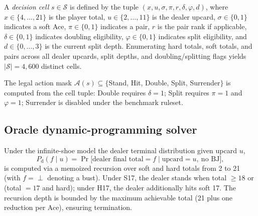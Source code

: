 \documentclass[12pt]{article}
\begin{document}
A \emph{decision cell} $s \in \mathcal{S}$ is defined by the tuple
$(x, u, \sigma, \pi, r, \delta, \varphi, d)$, where $x \in \{4,\ldots,21\}$ is the
player total, $u \in \{2,\ldots,11\}$ is the dealer upcard, $\sigma \in \{0,1\}$
indicates a soft Ace, $\pi \in \{0,1\}$ indicates a pair, $r$ is the pair rank if
applicable, $\delta \in \{0,1\}$ indicates doubling eligibility, $\varphi \in \{0,1\}$
indicates split eligibility, and $d \in \{0,\ldots,3\}$ is the current split depth.
Enumerating hard totals, soft totals, and pairs across all dealer upcards, split depths,
and doubling/splitting flags yields $|\mathcal{S}| = 4{,}600$ distinct cells.

The legal action mask $\mathcal{A}(s) \subseteq \{$Stand, Hit, Double, Split, Surrender$\}$
is computed from the cell tuple: Double requires $\delta=1$; Split requires $\pi=1$
and $\varphi=1$; Surrender is disabled under the benchmark ruleset.

\subsection{Oracle dynamic-programming solver}

Under the infinite-shoe model the dealer terminal distribution given upcard $u$,
\begin{equation}
  P_\mathrm{d}(f \mid u) = \Pr\bigl[\text{dealer final total} = f \mid \text{upcard} = u,\ \text{no BJ}\bigr],
\end{equation}
is computed via a memoized recursion over soft and hard totals from 2 to 21 (with
$f = \perp$ denoting a bust).  Under S17, the dealer stands when total $\geq 18$ or
(total $= 17$ and hard); under H17, the dealer additionally hits soft 17.  The
recursion depth is bounded by the maximum achievable total (21 plus one reduction per
Ace), ensuring termination.
\end{document}
